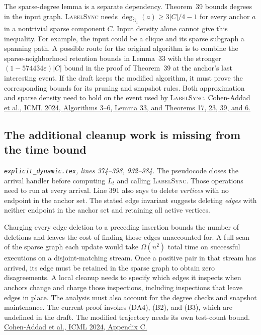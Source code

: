 \documentclass[11pt]{article}
\newcommand{\loc}[2]{\textit{#1, lines #2.}}
\newcommand{\ed}[1]{\loc{\texttt{explicit\_dynamic.tex}}{#1}}
\begin{document}
The sparse-degree lemma is a separate dependency. Theorem~39 bounds
degrees in the input graph. \textsc{LabelSync} needs
\(\deg_{\widetilde G_t}(a)\ge 3|C|/4-1\) for every anchor \(a\)
in a nontrivial sparse component \(C\). Input density alone cannot give
this inequality. For example, the input could be a clique and its sparse
subgraph a spanning path. A possible route for the original algorithm
is to combine the sparse-neighborhood retention bounds in Lemma~33
with the stronger \((1-574434\varepsilon)|C|\) bound in the proof of
Theorem~39 at the anchor's last interesting event. If the draft keeps
the modified algorithm, it must prove the corresponding bounds for its
pruning and snapshot rules. Both approximation and sparse density need
to hold on the event used by \textsc{LabelSync}.
\href{https://openreview.net/attachment?id=3YG55Lbcnr&name=pdf}{Cohen-Addad et al.,
ICML 2024, Algorithms 3--6, Lemma 33, and Theorems 17, 23, 39, and 6.}

\subsection{The additional cleanup work is missing from the time bound}

\ed{374--398, 932--984}
The pseudocode closes the arrival handler before computing \(L_t\) and
calling \textsc{LabelSync}. Those operations need to run at every arrival.
Line 391 also says to delete \emph{vertices} with no endpoint in the
anchor set. The stated edge invariant suggests deleting \emph{edges}
with neither endpoint in the anchor set and retaining all active vertices.

Charging every edge deletion to a preceding insertion bounds the number
of deletions and leaves the cost of finding those edges unaccounted for. A full
scan of the sparse graph each update would take \(\Omega(n^2)\) total
time on successful executions on a disjoint-matching stream. Once a
positive pair in that stream has arrived, its edge must be retained in
the sparse graph to obtain zero disagreements. A local cleanup needs to
specify which edges it inspects when anchors change and charge those
inspections, including inspections that leave edges in place. The
analysis must also account for the degree checks and snapshot
maintenance. The current proof invokes (DA4), (B2), and (B3), which
are undefined in the draft. The modified trajectory needs its own
test-count bound.
\href{https://openreview.net/attachment?id=3YG55Lbcnr&name=pdf}{Cohen-Addad et al.,
ICML 2024, Appendix C.}
\end{document}
